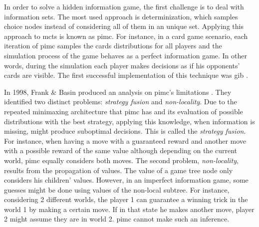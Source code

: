 In order to solve a hidden information game, the first challenge is to deal with information sets.
The most used approach is determinization, which samples choice nodes instead of considering all of them in an unique set.
Applying this approach to \gls{mcts} is known as \gls{pimc}.
For instance, in a card game scenario, each iteration of \gls{pimc} samples the cards distributions for all players and the simulation process of the game behaves as a perfect information game.
In other words, during the simulation each player makes decisions as if his opponents' cards are visible.
The first successful implementation of this technique was \gls{gib} \cite{Ginsberg2001}.


In 1998, Frank \& Basin produced an analysis on \gls{pimc}'s limitations \cite{Frank1998}.
They identified two distinct problems: \emph{strategy fusion} and \emph{non-locality}.
Due to the repeated minimaxing architecture that \gls{pimc} has and its evaluation of possible distributions with the best strategy, applying this knowledge, when information is missing, might produce suboptimal decisions.
This is called the \emph{strategy fusion}.
For instance, when having a move with a guaranteed reward and another move with a possible reward of the same value although depending on the current world, \gls{pimc} equally considers both moves.
The second problem, \emph{non-locality}, results from the propagation of values.
The value of a game tree node only considers his children' values.
However, in an imperfect information game, some guesses might be done using values of the non-local subtree.
For instance, considering 2 different worlds, the player 1 can guarantee a winning trick in the world 1 by making a certain move.
If in that state he makes another move, player 2 might assume they are in world 2.
\gls{pimc} cannot make such an inference.


